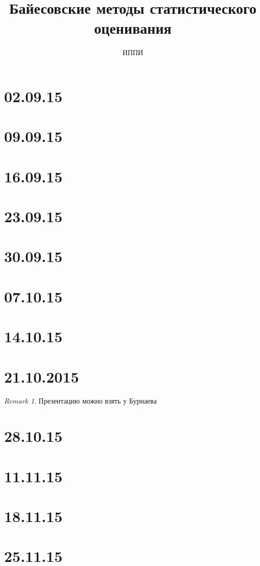 \documentclass[a4paper]{article}
\title{Байесовские методы статистического оценивания}
\author{ИППИ}
\theoremstyle{plain}
\theoremstyle{remark}
\newtheorem*{remark}{Remark}
\theoremstyle{definition}
\begin{document}
\maketitle

\section*{02.09.15}


\section*{09.09.15}


\section*{16.09.15}


\section*{23.09.15}


\section*{30.09.15}


\section*{07.10.15}


\section*{14.10.15}


\section*{21.10.2015}
\begin{remark}
	Презентацию можно взять у Бурнаева
\end{remark}

\section*{28.10.15}


\section*{11.11.15}


\section{18.11.15}


\section{25.11.15} 

\end{document}
